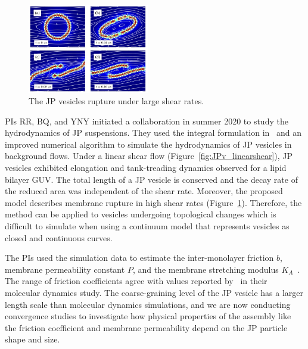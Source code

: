 \begin{figure}
\includegraphics[width=0.475\textwidth]{figures/PreliminaryWork/Rupture.jpg}
\caption{\label{fig:JPv_rupture}The JP vesicles rupture under large shear rates.}
\end{figure}
%
PIs RR, BQ, and YNY initiated a collaboration in summer 2020 to study
the hydrodynamics of JP suspensions. They used the integral formulation
in~\cite{Fu2018_SIAM} and an improved numerical algorithm to simulate
the hydrodynamics of JP vesicles in background flows. Under a linear
shear flow (Figure~\ref{fig:JPv_linearshear}), JP vesicles exhibited
elongation and tank-treading dynamics observed for a lipid bilayer GUV.
The total length of a JP vesicle is conserved and the decay rate of the
reduced area was independent of the shear rate.  Moreover, the proposed
model describes membrane rupture in high shear rates
(Figure~\ref{fig:JPv_rupture}). Therefore, the method can be applied to
vesicles undergoing topological changes which is difficult to simulate
when using a continuum model that represents vesicles as closed and
continuous curves.
%
%

%
%
The PIs used the simulation data to estimate the inter-monolayer
friction $b$, membrane permeability constant $P$, and the membrane
stretching modulus $K_A$~\cite{chabanon2017, sch_vla_mik2010}. The range
of friction coefficients agree with values reported
by~\cite{denOtter2007} in their molecular dynamics study. The
coarse-graining level of the JP vesicle has a larger length scale than
molecular dynamics simulations, and we are now conducting convergence
studies to investigate how physical properties of the assembly like the
friction coefficient and membrane permeability depend on the JP particle
shape and size.

